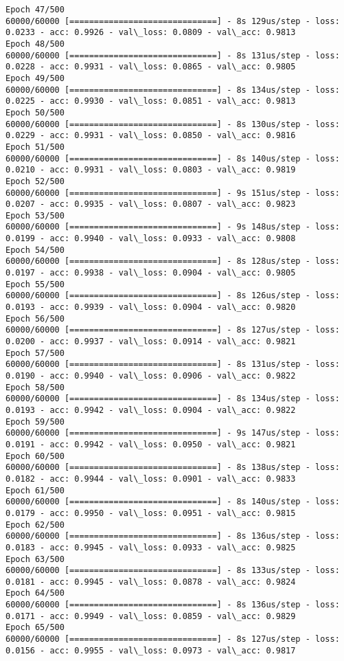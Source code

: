 \documentclass[11pt]{article}
\begin{document}
\begin{Verbatim}[commandchars=\\\{\}]
Epoch 47/500
60000/60000 [==============================] - 8s 129us/step - loss: 0.0233 - acc: 0.9926 - val\_loss: 0.0809 - val\_acc: 0.9813
Epoch 48/500
60000/60000 [==============================] - 8s 131us/step - loss: 0.0228 - acc: 0.9931 - val\_loss: 0.0865 - val\_acc: 0.9805
Epoch 49/500
60000/60000 [==============================] - 8s 134us/step - loss: 0.0225 - acc: 0.9930 - val\_loss: 0.0851 - val\_acc: 0.9813
Epoch 50/500
60000/60000 [==============================] - 8s 130us/step - loss: 0.0229 - acc: 0.9931 - val\_loss: 0.0850 - val\_acc: 0.9816
Epoch 51/500
60000/60000 [==============================] - 8s 140us/step - loss: 0.0210 - acc: 0.9931 - val\_loss: 0.0803 - val\_acc: 0.9819
Epoch 52/500
60000/60000 [==============================] - 9s 151us/step - loss: 0.0207 - acc: 0.9935 - val\_loss: 0.0807 - val\_acc: 0.9823
Epoch 53/500
60000/60000 [==============================] - 9s 148us/step - loss: 0.0199 - acc: 0.9940 - val\_loss: 0.0933 - val\_acc: 0.9808
Epoch 54/500
60000/60000 [==============================] - 8s 128us/step - loss: 0.0197 - acc: 0.9938 - val\_loss: 0.0904 - val\_acc: 0.9805
Epoch 55/500
60000/60000 [==============================] - 8s 126us/step - loss: 0.0193 - acc: 0.9939 - val\_loss: 0.0904 - val\_acc: 0.9820
Epoch 56/500
60000/60000 [==============================] - 8s 127us/step - loss: 0.0200 - acc: 0.9937 - val\_loss: 0.0914 - val\_acc: 0.9821
Epoch 57/500
60000/60000 [==============================] - 8s 131us/step - loss: 0.0190 - acc: 0.9940 - val\_loss: 0.0906 - val\_acc: 0.9822
Epoch 58/500
60000/60000 [==============================] - 8s 134us/step - loss: 0.0193 - acc: 0.9942 - val\_loss: 0.0904 - val\_acc: 0.9822
Epoch 59/500
60000/60000 [==============================] - 9s 147us/step - loss: 0.0191 - acc: 0.9942 - val\_loss: 0.0950 - val\_acc: 0.9821
Epoch 60/500
60000/60000 [==============================] - 8s 138us/step - loss: 0.0182 - acc: 0.9944 - val\_loss: 0.0901 - val\_acc: 0.9833
Epoch 61/500
60000/60000 [==============================] - 8s 140us/step - loss: 0.0179 - acc: 0.9950 - val\_loss: 0.0951 - val\_acc: 0.9815
Epoch 62/500
60000/60000 [==============================] - 8s 136us/step - loss: 0.0183 - acc: 0.9945 - val\_loss: 0.0933 - val\_acc: 0.9825
Epoch 63/500
60000/60000 [==============================] - 8s 133us/step - loss: 0.0181 - acc: 0.9945 - val\_loss: 0.0878 - val\_acc: 0.9824
Epoch 64/500
60000/60000 [==============================] - 8s 136us/step - loss: 0.0171 - acc: 0.9949 - val\_loss: 0.0859 - val\_acc: 0.9829
Epoch 65/500
60000/60000 [==============================] - 8s 127us/step - loss: 0.0156 - acc: 0.9955 - val\_loss: 0.0973 - val\_acc: 0.9817

\end{Verbatim}
\end{document}
